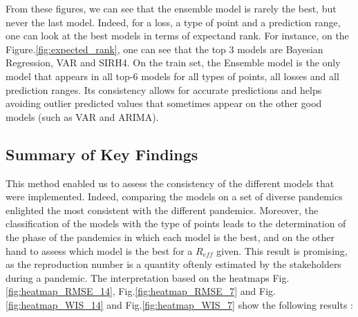 From these figures, we can see that the ensemble model is rarely the best, but never the last model. 
Indeed, for a loss, a type of point and a prediction range, one can look at the best models in terms of expectand rank.
For instance, on the Figure.\ref{fig:expected_rank}, one can see that the top 3 models are Bayesian Regression, VAR and SIRH4. 
On the train set, the Ensemble model is the only model that appears in all top-6 models for all types of points, all losses and all prediction ranges.
Its consistency allows for accurate predictions and helps avoiding outlier predicted values that sometimes appear on the other good models (such as VAR and ARIMA). 



\subsection{Summary of Key Findings}

This method enabled us to assess the consistency of the different models that were implemented. 
Indeed, comparing the models on a set of diverse pandemics enlighted the most consistent with the different pandemics.
Moreover, the classification of the models with the type of points leads to the determination of the phase of the pandemics in which each model is the best, and on the other hand to assess which model is the best for a $R_{eff}$ given. 
This result is promising, as the reproduction number is a quantity oftenly estimated by the stakeholders during a pandemic. 
The interpretation based on the heatmaps Fig.\ref{fig:heatmap_RMSE_14}, Fig.\ref{fig:heatmap_RMSE_7} and Fig.\ref{fig:heatmap_WIS_14} and Fig.\ref{fig:heatmap_WIS_7} show the following results : \\



